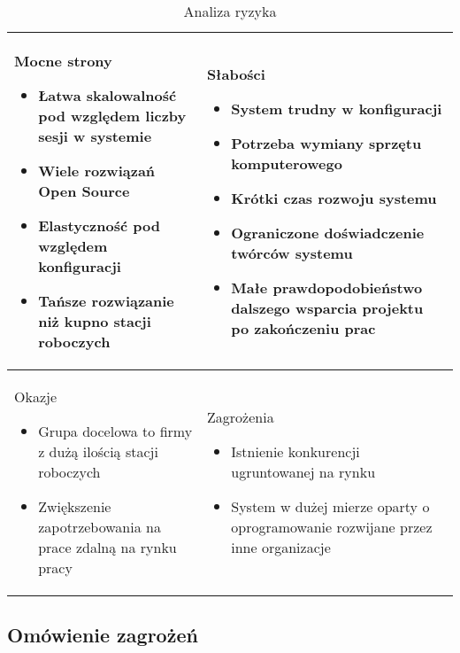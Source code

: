 \documentclass[../wstep.tex]{subfiles}
\begin{document}
\begin{table}[H]
    \caption[Analiza ryzyka]{Analiza ryzyka}
    \label{risk-analysis}
    \centering
    \begin{tabular}{| p{} | p{} |}
        \hline
        Mocne strony
        \begin{itemize}
            \item Łatwa skalowalność pod względem liczby sesji w systemie
            \item Wiele rozwiązań Open Source
            \item Elastyczność pod względem konfiguracji
            \item Tańsze rozwiązanie niż kupno stacji roboczych
        \end{itemize}
         &
        Słabości
        \begin{itemize}
            \item System trudny w konfiguracji
            \item Potrzeba wymiany sprzętu komputerowego
            \item Krótki czas rozwoju systemu
            \item Ograniczone doświadczenie twórców systemu
            \item Małe prawdopodobieństwo dalszego wsparcia projektu po zakończeniu prac
        \end{itemize}
        \\ \hline

        Okazje
        \begin{itemize}
            \item Grupa docelowa to firmy z dużą ilością stacji roboczych
            \item Zwiększenie zapotrzebowania na prace zdalną na rynku pracy
        \end{itemize}
         &

        Zagrożenia
        \begin{itemize}
            \item Istnienie konkurencji ugruntowanej na rynku
            \item System w dużej mierze oparty o oprogramowanie rozwijane przez inne organizacje
        \end{itemize}
        \\ \hline
    \end{tabular}
\end{table}

\subsection{Omówienie zagrożeń}
\end{document}
